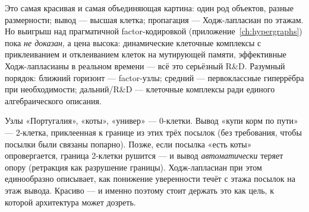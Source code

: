 \begin{principle}
Это самая красивая и самая объединяющая картина: один род объектов, разные
размерности; вывод — высшая клетка; пропагация — Ходж-лапласиан по этажам. Но
выигрыш над прагматичной factor-кодировкой (приложение~\ref{ch:hypergraphs}) пока
\emph{не доказан}, а цена высока: динамические клеточные комплексы с приклеиванием и
отклеиванием клеток на мутирующей памяти, эффективные Ходж-лапласианы в реальном
времени — всё это серьёзный R\&D. Разумный порядок: ближний горизонт — factor-узлы;
средний — первоклассные гиперрёбра при необходимости; дальний/R\&D — клеточные
комплексы ради единого алгебраического описания.
\end{principle}

\begin{workedbox}
Узлы «Португалия», «коты», «универ» — 0-клетки. Вывод «купи корм по пути» — 2-клетка,
приклеенная к границе из этих трёх посылок (без требования, чтобы посылки были
связаны попарно). Позже, если посылка «есть коты» опровергается, граница 2-клетки
рушится — и вывод \emph{автоматически} теряет опору (ретракция как разрушение
границы). Ходж-лапласиан при этом единообразно описывает, как понижение уверенности
течёт с этажа посылок на этаж вывода. Красиво — и именно поэтому стоит держать это
как цель, к которой архитектура может дозреть.
\end{workedbox}
